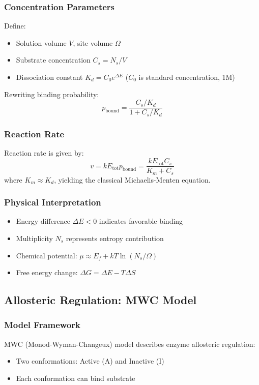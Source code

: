 \documentclass[12pt]{article}
\begin{document}
\subsubsection{Concentration Parameters}
Define:
\begin{itemize}
    \item Solution volume $V$, site volume $\Omega$
    \item Substrate concentration $C_s = N_s / V$
    \item Dissociation constant $K_d = C_0 e^{\Delta E}$ ($C_0$ is standard concentration, 1M)
\end{itemize}

Rewriting binding probability:
\begin{equation}
p_{\text{bound}} = \frac{C_s / K_d}{1 + C_s / K_d}
\end{equation}

\subsubsection{Reaction Rate}
Reaction rate is given by:
\begin{equation}
v = k E_{\text{tot}} p_{\text{bound}} = \frac{k E_{\text{tot}} C_s}{K_m + C_s}
\end{equation}
where $K_m \approx K_d$, yielding the classical Michaelis-Menten equation.

\subsubsection{Physical Interpretation}
\begin{itemize}
    \item Energy difference $\Delta E < 0$ indicates favorable binding
    \item Multiplicity $N_s$ represents entropy contribution
    \item Chemical potential: $\mu \approx E_f + kT \ln (N_s / \Omega)$
    \item Free energy change: $\Delta G = \Delta E - T \Delta S$
\end{itemize}

\subsection{Allosteric Regulation: MWC Model}

\subsubsection{Model Framework}
MWC (Monod-Wyman-Changeux) model describes enzyme allosteric regulation:
\begin{itemize}
    \item Two conformations: Active (A) and Inactive (I)
    \item Each conformation can bind substrate
\end{itemize}
\end{document}
